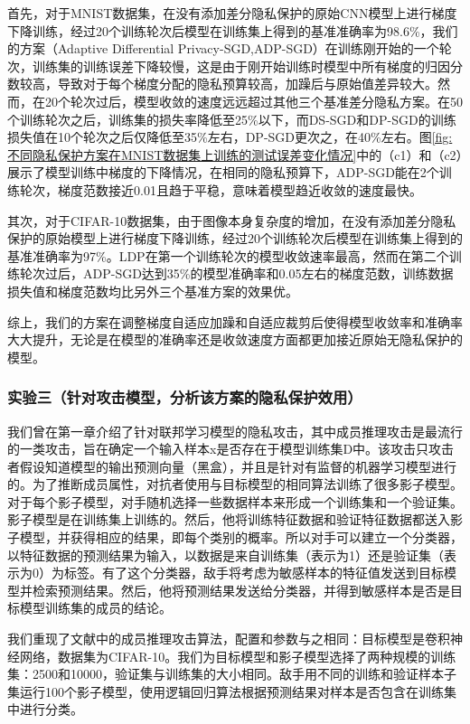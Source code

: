 首先，对于MNIST数据集，在没有添加差分隐私保护的原始CNN模型上进行梯度下降训练，经过20个训练轮次后模型在训练集上得到的基准准确率为98.6\%，我们的方案（Adaptive Differential Privacy-SGD,ADP-SGD）在训练刚开始的一个轮次，训练集的训练误差下降较慢，这是由于刚开始训练时模型中所有梯度的归因分数较高，导致对于每个梯度分配的隐私预算较高，加躁后与原始值差异较大。然而，在20个轮次过后，模型收敛的速度远远超过其他三个基准差分隐私方案。在50个训练轮次之后，训练集的损失率降低至25\%以下，而DS-SGD和DP-SGD的训练损失值在10个轮次之后仅降低至35\%左右，DP-SGD更次之，在40\%左右。图\ref{fig:不同隐私保护方案在MNIST数据集上训练的测试误差变化情况}中的（c1）和（c2）展示了模型训练中梯度的下降情况，在相同的隐私预算下，ADP-SGD能在2个训练轮次，梯度范数接近0.01且趋于平稳，意味着模型趋近收敛的速度最快。

其次，对于CIFAR-10数据集，由于图像本身复杂度的增加，在没有添加差分隐私保护的原始模型上进行梯度下降训练，经过20个训练轮次后模型在训练集上得到的基准准确率为97\%。LDP在第一个训练轮次的模型收敛速率最高，然而在第二个训练轮次过后，ADP-SGD达到35\%的模型准确率和0.05左右的梯度范数，训练数据损失值和梯度范数均比另外三个基准方案的效果优。

综上，我们的方案在调整梯度自适应加躁和自适应裁剪后使得模型收敛率和准确率大大提升，无论是在模型的准确率还是收敛速度方面都更加接近原始无隐私保护的模型。

\subsubsection{实验三（针对攻击模型，分析该方案的隐私保护效用）} 
我们曾在第一章介绍了针对联邦学习模型的隐私攻击，其中成员推理攻击是最流行的一类攻击，旨在确定一个输入样本x是否存在于模型训练集D中。该攻击只攻击者假设知道模型的输出预测向量（黑盒），并且是针对有监督的机器学习模型进行的。为了推断成员属性，对抗者使用与目标模型的相同算法训练了很多影子模型。对于每个影子模型，对手随机选择一些数据样本来形成一个训练集和一个验证集。影子模型是在训练集上训练的。然后，他将训练特征数据和验证特征数据都送入影子模型，并获得相应的结果，即每个类别的概率。所以对手可以建立一个分类器，以特征数据的预测结果为输入，以数据是来自训练集（表示为1）还是验证集（表示为0）为标签。有了这个分类器，敌手将考虑为敏感样本的特征值发送到目标模型并检索预测结果。然后，他将预测结果发送给分类器，并得到敏感样本是否是目标模型训练集的成员的结论。

我们重现了文献中的成员推理攻击算法，配置和参数与之相同：目标模型是卷积神经网络，数据集为CIFAR-10。我们为目标模型和影子模型选择了两种规模的训练集：2500和10000，验证集与训练集的大小相同。敌手用不同的训练和验证样本子集运行100个影子模型，使用逻辑回归算法根据预测结果对样本是否包含在训练集中进行分类。

